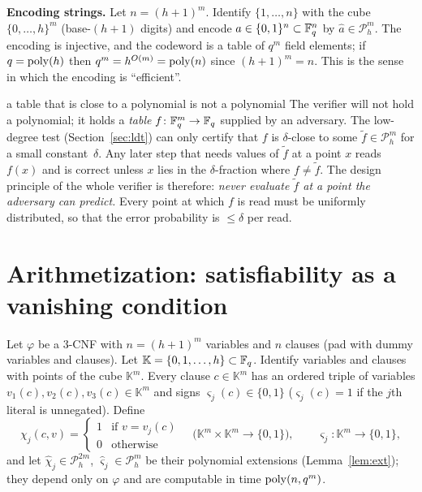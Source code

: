 \noindent
\textbf{Encoding strings.}  Let $n=(h+1)^m$.  Identify $\{1,\dots,n\}$ with the cube $\{0,\dots,h\}^m$ (base-$(h+1)$ digits) and encode $a\in\{0,1\}^n\subset\mathbb{F}_q^n$ by
$\hat a\in\mathcal P^m_h$.  The encoding is injective, and the codeword is a table of $q^m$ field elements; if $q=\operatorname{poly}(h)$ then
$q^m=h^{O(m)}=\operatorname{poly}(n)$ since $(h+1)^m=n$.  This is the sense in which the encoding is ``efficient''.

\begin{pitfall}{a table that is close to a polynomial is not a polynomial}
The verifier will not hold a polynomial; it holds a \emph{table} $f\colon\mathbb{F}_q^m\to\mathbb{F}_q$ supplied by an adversary.  The low-degree test (Section~\ref{sec:ldt}) can only certify that
$f$ is $\delta$-close to some $\tilde f\in\mathcal P^m_h$ for a small constant~$\delta$.  Any later step that needs values of $\tilde f$ at a point $x$ reads $f(x)$ and is correct unless $x$
lies in the $\delta$-fraction where $f\ne\tilde f$.  The design principle of the whole verifier is therefore: \emph{never evaluate $\tilde f$ at a point the adversary can predict.}
Every point at which $f$ is read must be uniformly distributed, so that the error probability is $\le\delta$ per read.
\end{pitfall}


\section{Arithmetization: satisfiability as a vanishing condition}
\label{sec:arith}

Let $\varphi$ be a $3$-CNF with $n=(h+1)^m$ variables and $n$ clauses (pad with dummy variables and clauses).  Let $\mathbb K=\{0,1,\dots,h\}\subset\mathbb{F}_q$.  Identify variables and clauses with
points of the cube $\mathbb K^m$.  Every clause $c\in\mathbb K^m$ has an ordered triple of variables $v_1(c),v_2(c),v_3(c)\in\mathbb K^m$ and signs
$\varsigma_j(c)\in\{0,1\}$ ($\varsigma_j(c)=1$ if the $j$th literal is unnegated).  Define
\[
  \chi_j(c,v)=\begin{cases}1&\text{if }v=v_j(c)\\0&\text{otherwise}\end{cases}\quad\bigl(\mathbb K^m\times\mathbb K^m\to\{0,1\}\bigr),\qquad
  \varsigma_j\colon\mathbb K^m\to\{0,1\},
\]
and let $\hat\chi_j\in\mathcal P^{2m}_h$, $\hat\varsigma_j\in\mathcal P^m_h$ be their polynomial extensions (Lemma~\ref{lem:ext}); they depend only on
$\varphi$ and are computable in time $\operatorname{poly}(n,q^m)$.

